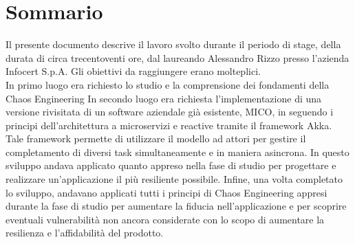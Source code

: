 
{}
{}
\begingroup
\let\clearpage\relax
\let\cleardoublepage\relax
\let\cleardoublepage\relax

\chapter*{Sommario}

Il presente documento descrive il lavoro svolto durante il periodo di stage, della durata di circa trecentoventi ore, dal laureando Alessandro Rizzo presso l'azienda Infocert S.p.A.
Gli obiettivi da raggiungere erano molteplici.\\
In primo luogo era richiesto lo studio e la comprensione dei fondamenti della Chaos Engineering
In secondo luogo era richiesta l'implementazione di una versione rivisitata di un software aziendale già esistente, MICO, in seguendo i principi dell'architettura a microservizi e reactive tramite il framework Akka.
Tale framework permette di utilizzare il modello ad attori per gestire il completamento di diversi task simultaneamente e in maniera asincrona.
In questo sviluppo andava applicato quanto appreso nella fase di studio per progettare e realizzare un'applicazione il più resiliente possibile.
Infine, una volta completato lo sviluppo, andavano applicati tutti i principi di Chaos Engineering appresi durante la fase di studio per aumentare la fiducia nell'applicazione e per scoprire eventuali vulnerabilità non ancora considerate con lo scopo di aumentare la resilienza e l'affidabilità del prodotto.

%
%

\endgroup			

\vfill

